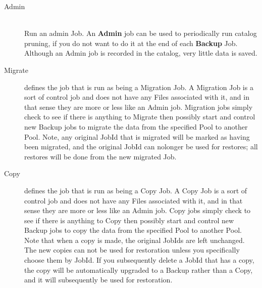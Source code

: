 {\begin{description}
\item [Admin] \hfill \\
Run an admin Job. An {\bf Admin} job can  be used to periodically run catalog
pruning, if you  do not want to do it at the end of each {\bf Backup}  Job.
Although an Admin job is recorded in the  catalog, very little data is saved.

\item [Migrate]
   defines the job that is run as being a
   Migration Job.  A Migration Job is a sort of control job and does not have
   any Files associated with it, and in that sense they are more or less like
   an Admin job.  Migration jobs simply check to see if there is anything to
   Migrate then possibly start and control new Backup jobs to migrate the data
   from the specified Pool to another Pool.  Note, any original JobId that
   is migrated will be marked as having been migrated, and the original
   JobId can nolonger be used for restores; all restores will be done from
   the new migrated Job.

\item [Copy]
   defines the job that is run as being a
   Copy Job.  A Copy Job is a sort of control job and does not have
   any Files associated with it, and in that sense they are more or less like
   an Admin job.  Copy jobs simply check to see if there is anything to
   Copy then possibly start and control new Backup jobs to copy the data
   from the specified Pool to another Pool.  Note that when a copy is
   made, the original JobIds are left unchanged. The new copies can not
   be used for restoration unless you specifically choose them by JobId.
   If you subsequently delete a JobId that has a copy, the copy will be
   automatically upgraded to a Backup rather than a Copy, and it will
   subsequently be used for restoration.
\end{description}
}




